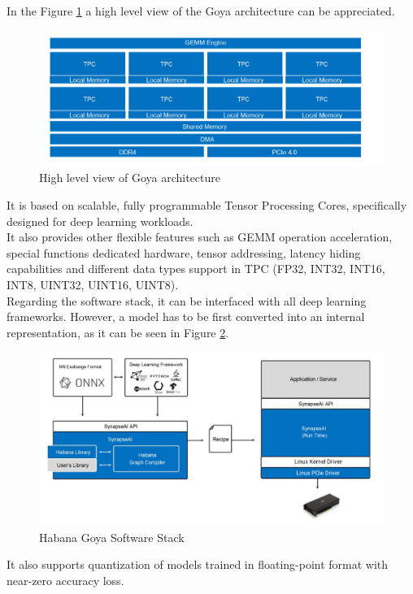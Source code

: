 In the Figure \ref{fig:goyaarch} a high level view of the Goya architecture can be appreciated.
\begin{figure}[H]
\centering
\captionsetup{justification=centering}
\includegraphics[scale=0.7]{./figure/goya_arch.PNG}
\caption{High level view of Goya architecture\cite{paper:38}}
\label{fig:goyaarch}
\end{figure}

It is based on scalable, fully programmable Tensor Processing Cores, specifically designed for deep learning workloads. \\
It also provides other flexible features such as GEMM operation acceleration, special functions dedicated hardware, tensor addressing, latency hiding capabilities and different data types support in TPC (FP32, INT32, INT16, INT8, UINT32, UINT16, UINT8).\\

Regarding the software stack, it can be interfaced with all deep learning frameworks. However, a model has to be first converted into an internal representation, as it can be seen in Figure \ref{fig:goyaswstack}.
\begin{figure}[H]
\centering
\captionsetup{justification=centering}
\includegraphics[scale=0.5]{./figure/goya_sw_stack.PNG}
\caption{Habana Goya Software Stack\cite{paper:38}}
\label{fig:goyaswstack}
\end{figure}
It also supports quantization of models trained in floating-point format with near-zero accuracy loss.